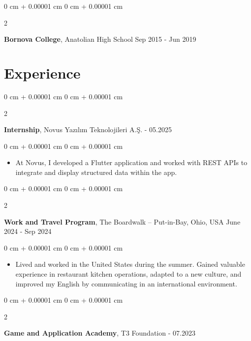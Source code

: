 \documentclass[10pt, letterpaper]{article}
\newenvironment{highlights}{
    \begin{itemize}[
        topsep=0.10 cm,
        parsep=0.10 cm,
        partopsep=0pt,
        itemsep=0pt,
        leftmargin=0 cm + 10pt
    ]
}{
    \end{itemize}
} %
\newenvironment{onecolentry}{
    \begin{adjustwidth}{
        0 cm + 0.00001 cm
    }{
        0 cm + 0.00001 cm
    }
}{
    \end{adjustwidth}
} %
\newenvironment{twocolentry}[2][]{
    \onecolentry
    \def\secondColumn{#2}
    \setcolumnwidth{\fill, 4.5 cm}
    \begin{paracol}{2}
}{
    \switchcolumn \raggedleft \secondColumn
    \end{paracol}
    \endonecolentry
} %
\begin{document}
    \begin{twocolentry}{
        Sep 2015 - Jun 2019
    }
        \textbf{Bornova College}, Anatolian High School\end{twocolentry}


    \section{Experience}

    \begin{twocolentry}{
        04.2025 - 05.2025
    }
        \textbf{Internship}, Novus Yazılım Teknolojileri A.Ş.\end{twocolentry}

    \vspace{0.10 cm}
    \begin{onecolentry}
        \begin{highlights}
            \item At Novus, I developed a Flutter application and worked with REST APIs to integrate and display structured data within the app.
        \end{highlights}
    \end{onecolentry}

    \vspace{0.2 cm}

    \begin{twocolentry}{
        June 2024 - Sep 2024
    }
        \textbf{Work and Travel Program}, The Boardwalk -- Put-in-Bay, Ohio, USA\end{twocolentry}

    \vspace{0.10 cm}
    \begin{onecolentry}
        \begin{highlights}
            \item Lived and worked in the United States during the summer. Gained valuable experience in restaurant kitchen operations, adapted to a new culture, and improved my English by communicating in an international environment.
        \end{highlights}
    \end{onecolentry}

    \vspace{0.2 cm}

    \begin{twocolentry}{
        11.2022 - 07.2023
    }
        \textbf{Game and Application Academy}, T3 Foundation\end{twocolentry}
\end{document}
